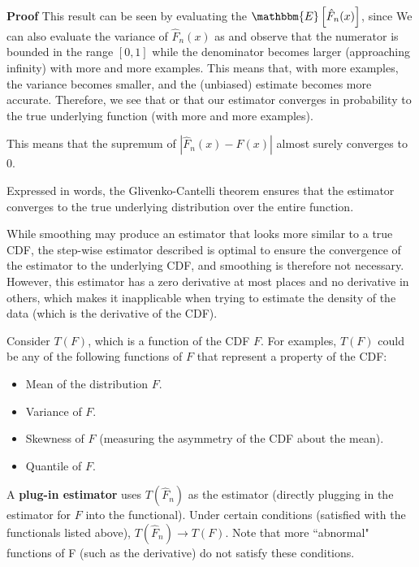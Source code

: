 \noindent \textbf{Proof}
This result can be seen by evaluating the $\mathbbm{E}\left[\hat{F}_n(x)\right]$, since
We can also evaluate the variance of $\hat{F}_n(x)$ as
and observe that the numerator is bounded in the range $\left[0,1 \right]$ while the denominator becomes larger (approaching infinity) with more and more examples. This means that, with more examples, the variance becomes smaller, and the (unbiased) estimate becomes more accurate. Therefore, we see that 
or that our estimator converges in probability to the true underlying function (with more and more examples).
\begin{theorem}
	This means that the supremum of $|\hat{F}_n(x) - F(x)|$ almost surely converges to 0.
\end{theorem}
Expressed in words, the Glivenko-Cantelli theorem ensures that the estimator converges to the true underlying distribution over the entire function.
\begin{remark}
While smoothing may produce an estimator that looks more similar to a true CDF, the step-wise estimator described is optimal to ensure the convergence of the estimator to the underlying CDF, and smoothing is therefore not necessary. However, this estimator has a zero derivative at most places and no derivative in others, which makes it inapplicable when trying to estimate the density of the data (which is the derivative of the CDF). 
\end{remark}

Consider $T(F)$, which is a function of the CDF $F$. For examples, $T(F)$ could be any of the following functions of $F$ that represent a property of the CDF:
\begin{itemize}
	\setlength\itemsep{0em}
	\item Mean of  the distribution $F$.
	\item Variance of $F$.
	\item Skewness of $F$ (measuring the asymmetry of the CDF about the mean).
	\item Quantile of $F$.
\end{itemize}
A \textbf{plug-in estimator} uses $T(\hat{F}_n)$ as the estimator (directly plugging in the estimator for $F$ into the functional). Under certain conditions (satisfied with the functionals listed above), $T(\hat{F}_n) \rightarrow T(F)$. Note that more ``abnormal" functions of F (such as the derivative) do not satisfy these conditions.

